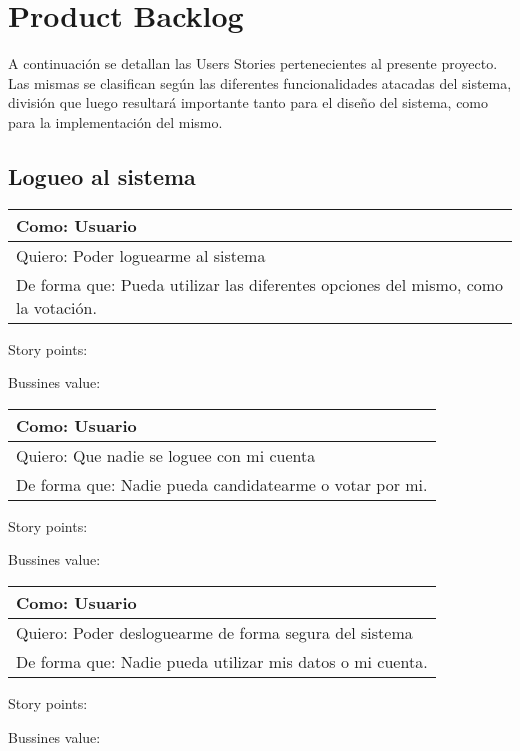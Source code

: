 \section{Product Backlog}


A continuaci\'on se detallan las Users Stories pertenecientes al presente proyecto.
Las mismas se clasifican seg\'un las diferentes funcionalidades atacadas del sistema, divisi\'on que luego resultar\'a importante tanto para el dise\~{n}o del sistema, como para la implementaci\'on del mismo.

\subsection{Logueo al sistema}


\bigskip

\begin{tabular}{|l|}
\hline
Como: Usuario\\
\hline
Quiero: Poder loguearme al sistema\\
\hline
De forma que: Pueda utilizar las diferentes opciones del mismo, como la votaci\'on. \\
\hline
\end{tabular}

\medskip
Story points:

\medskip
Bussines value:

\bigskip

\begin{tabular}{|l|}
\hline
Como: Usuario\\
\hline
Quiero: Que nadie se loguee con mi cuenta\\
\hline
De forma que: Nadie pueda candidatearme o votar por mi. \\
\hline
\end{tabular}

\medskip
Story points:

\medskip
Bussines value:


\bigskip

\begin{tabular}{|l|}
\hline
Como: Usuario\\
\hline
Quiero: Poder desloguearme de forma segura del sistema\\
\hline
De forma que: Nadie pueda utilizar mis datos o mi cuenta.\\
\hline
\end{tabular}

\medskip
Story points:

\medskip
Bussines value:


